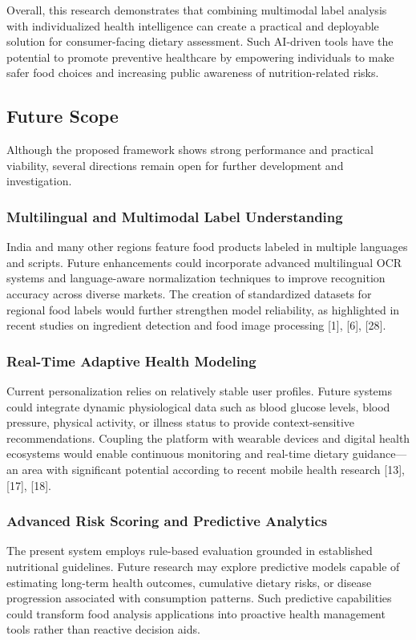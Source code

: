 \documentclass[conference]{IEEEtran}
\begin{document}
Overall, this research demonstrates that combining multimodal label analysis with individualized health intelligence can create a practical and deployable solution for consumer-facing dietary assessment. Such AI-driven tools have the potential to promote preventive healthcare by empowering individuals to make safer food choices and increasing public awareness of nutrition-related risks.

\subsection{Future Scope}

Although the proposed framework shows strong performance and practical viability, several directions remain open for further development and investigation.

\subsubsection{Multilingual and Multimodal Label Understanding}
India and many other regions feature food products labeled in multiple languages and scripts. Future enhancements could incorporate advanced multilingual OCR systems and language-aware normalization techniques to improve recognition accuracy across diverse markets. The creation of standardized datasets for regional food labels would further strengthen model reliability, as highlighted in recent studies on ingredient detection and food image processing [1], [6], [28].

\subsubsection{Real-Time Adaptive Health Modeling}
Current personalization relies on relatively stable user profiles. Future systems could integrate dynamic physiological data such as blood glucose levels, blood pressure, physical activity, or illness status to provide context-sensitive recommendations. Coupling the platform with wearable devices and digital health ecosystems would enable continuous monitoring and real-time dietary guidance—an area with significant potential according to recent mobile health research [13], [17], [18].

\subsubsection{Advanced Risk Scoring and Predictive Analytics}
The present system employs rule-based evaluation grounded in established nutritional guidelines. Future research may explore predictive models capable of estimating long-term health outcomes, cumulative dietary risks, or disease progression associated with consumption patterns. Such predictive capabilities could transform food analysis applications into proactive health management tools rather than reactive decision aids.
\end{document}
